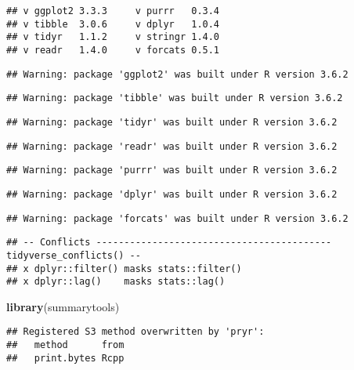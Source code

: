 \documentclass[
]{article}
\newenvironment{Shaded}{\begin{snugshade}}{\end{snugshade}}
\newcommand{\KeywordTok}[1]{\textcolor[rgb]{0.13,0.29,0.53}{\textbf{#1}}}
\newcommand{\NormalTok}[1]{#1}
\begin{document}
\begin{verbatim}
## v ggplot2 3.3.3     v purrr   0.3.4
## v tibble  3.0.6     v dplyr   1.0.4
## v tidyr   1.1.2     v stringr 1.4.0
## v readr   1.4.0     v forcats 0.5.1
\end{verbatim}

\begin{verbatim}
## Warning: package 'ggplot2' was built under R version 3.6.2
\end{verbatim}

\begin{verbatim}
## Warning: package 'tibble' was built under R version 3.6.2
\end{verbatim}

\begin{verbatim}
## Warning: package 'tidyr' was built under R version 3.6.2
\end{verbatim}

\begin{verbatim}
## Warning: package 'readr' was built under R version 3.6.2
\end{verbatim}

\begin{verbatim}
## Warning: package 'purrr' was built under R version 3.6.2
\end{verbatim}

\begin{verbatim}
## Warning: package 'dplyr' was built under R version 3.6.2
\end{verbatim}

\begin{verbatim}
## Warning: package 'forcats' was built under R version 3.6.2
\end{verbatim}

\begin{verbatim}
## -- Conflicts ------------------------------------------ tidyverse_conflicts() --
## x dplyr::filter() masks stats::filter()
## x dplyr::lag()    masks stats::lag()
\end{verbatim}

\begin{Shaded}
\begin{Highlighting}[]
\KeywordTok{library}\NormalTok{(summarytools)}
\end{Highlighting}
\end{Shaded}

\begin{verbatim}
## Registered S3 method overwritten by 'pryr':
##   method      from
##   print.bytes Rcpp
\end{verbatim}
\end{document}
